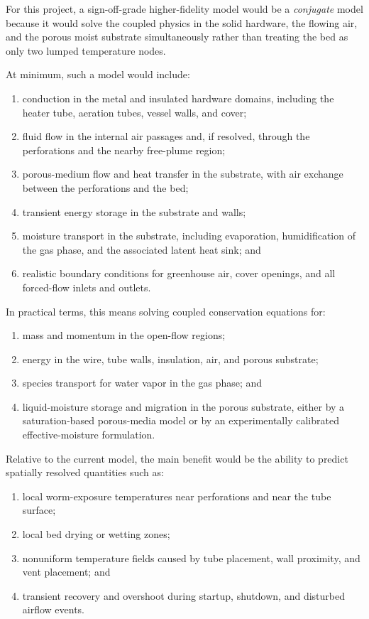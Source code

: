 \documentclass{article}
\begin{document}
For this project, a sign-off-grade higher-fidelity model would be a
\emph{conjugate} model because it would solve the coupled physics in the
solid hardware, the flowing air, and the porous moist substrate
simultaneously rather than treating the bed as only two lumped temperature
nodes.

At minimum, such a model would include:
\begin{enumerate}
\item conduction in the metal and insulated hardware domains, including the
heater tube, aeration tubes, vessel walls, and cover;
\item fluid flow in the internal air passages and, if resolved, through the
perforations and the nearby free-plume region;
\item porous-medium flow and heat transfer in the substrate, with air exchange
between the perforations and the bed;
\item transient energy storage in the substrate and walls;
\item moisture transport in the substrate, including evaporation,
humidification of the gas phase, and the associated latent heat sink; and
\item realistic boundary conditions for greenhouse air, cover openings, and
all forced-flow inlets and outlets.
\end{enumerate}

In practical terms, this means solving coupled conservation equations for:
\begin{enumerate}
\item mass and momentum in the open-flow regions;
\item energy in the wire, tube walls, insulation, air, and porous substrate;
\item species transport for water vapor in the gas phase; and
\item liquid-moisture storage and migration in the porous substrate, either by
a saturation-based porous-media model or by an experimentally calibrated
effective-moisture formulation.
\end{enumerate}

Relative to the current model, the main benefit would be the ability to
predict spatially resolved quantities such as:
\begin{enumerate}
\item local worm-exposure temperatures near perforations and near the tube
surface;
\item local bed drying or wetting zones;
\item nonuniform temperature fields caused by tube placement, wall proximity,
and vent placement; and
\item transient recovery and overshoot during startup, shutdown, and disturbed
airflow events.
\end{enumerate}
\end{document}
